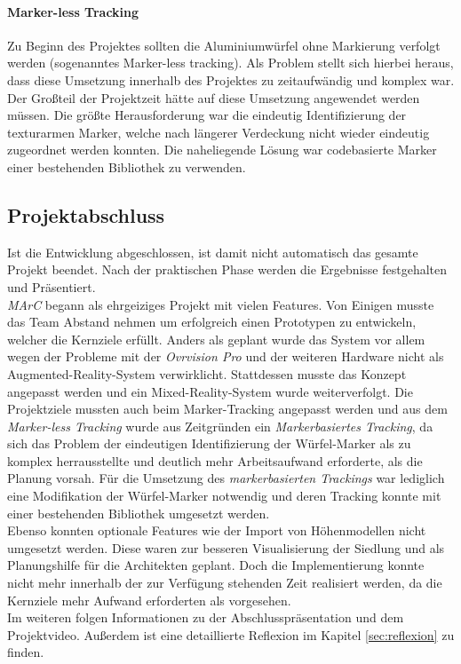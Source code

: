 \paragraph{Marker-less Tracking}
Zu Beginn des Projektes sollten die Aluminiumwürfel ohne Markierung verfolgt werden (sogenanntes Marker-less tracking). Als Problem stellt sich hierbei heraus, dass diese Umsetzung innerhalb des Projektes zu zeitaufwändig und komplex war. Der Großteil der Projektzeit hätte auf diese Umsetzung angewendet werden müssen. Die größte Herausforderung war die eindeutig Identifizierung der texturarmen Marker, welche nach längerer Verdeckung nicht wieder eindeutig zugeordnet werden konnten. Die naheliegende Lösung war codebasierte Marker einer bestehenden Bibliothek zu verwenden.


\subsection{Projektabschluss}
Ist die Entwicklung abgeschlossen, ist damit nicht automatisch das gesamte Projekt beendet. Nach der praktischen Phase werden die Ergebnisse festgehalten und Präsentiert. \\
\textit{MArC} begann als ehrgeiziges Projekt mit vielen Features. Von Einigen musste das Team Abstand nehmen um erfolgreich einen Prototypen zu entwickeln, welcher die Kernziele erfüllt. Anders als geplant wurde das System vor allem wegen der Probleme mit der \textit{Ovrvision Pro} und der weiteren Hardware nicht als Augmented-Reality-System verwirklicht. Stattdessen musste das Konzept angepasst werden und ein Mixed-Reality-System wurde weiterverfolgt. 
Die Projektziele mussten auch beim Marker-Tracking angepasst werden und aus dem \textit{Marker-less Tracking} wurde aus Zeitgründen ein \textit{Markerbasiertes Tracking}, da sich das Problem der eindeutigen Identifizierung der Würfel-Marker als zu komplex herrausstellte und deutlich mehr Arbeitsaufwand erforderte, als die Planung vorsah. Für die Umsetzung des \textit{markerbasierten Trackings} war lediglich eine Modifikation der Würfel-Marker notwendig und deren Tracking konnte mit einer bestehenden Bibliothek umgesetzt werden.\\
Ebenso konnten optionale Features wie der Import von Höhenmodellen nicht umgesetzt werden. Diese waren zur besseren Visualisierung der Siedlung und als Planungshilfe für die Architekten geplant. Doch die Implementierung konnte nicht mehr innerhalb der zur Verfügung stehenden Zeit realisiert werden, da die Kernziele mehr Aufwand erforderten als vorgesehen.\\
Im weiteren folgen Informationen zu der Abschlusspräsentation und dem Projektvideo. Außerdem ist eine detaillierte Reflexion im Kapitel \ref{sec:reflexion} zu finden.
